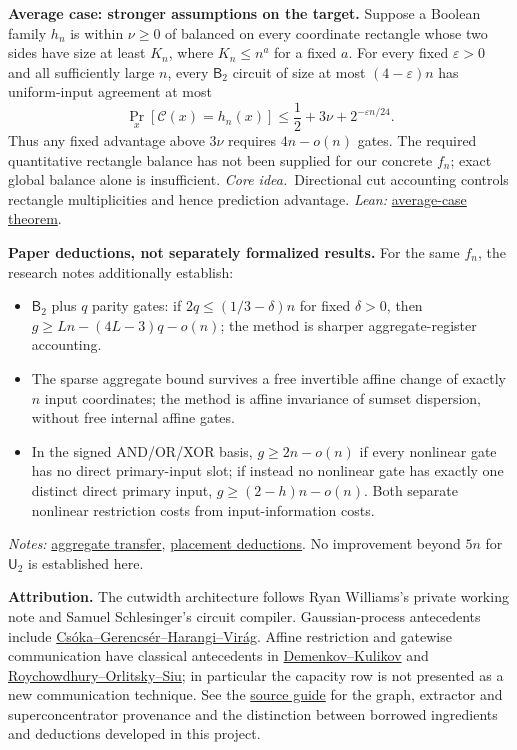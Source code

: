\documentclass[11pt]{article}
\providecommand{\RepoRoot}{../../}
\newcommand{\repolink}[2]{\href{\RepoRoot#1}{#2}}
\newcommand{\leanlink}[2]{\repolink{Complexitylib/Algebraic/LowerBound/Cutwidth/#1}{#2}}
\newcommand{\method}{\textit{Core idea.}\ }
\newcommand{\Btwo}{\mathsf{B}_2}
\newcommand{\little}[1]{o(#1)}
\begin{document}
\textbf{Average case: stronger assumptions on the target.}
Suppose a Boolean family $h_n$ is within $\nu\geq0$ of balanced on every
coordinate rectangle whose two sides have size at least $K_n$, where
$K_n\leq n^a$ for a fixed $a$. For every fixed $\varepsilon>0$ and all
sufficiently large $n$, every $\Btwo$ circuit of size at most $(4-\varepsilon)n$
has uniform-input agreement at most
\[
  \Pr_x[\mathcal C(x)=h_n(x)]
  \leq\frac12+3\nu+2^{-\varepsilon n/24}.
\]
Thus any fixed advantage above $3\nu$ requires $4n-\little n$ gates.
The required quantitative rectangle balance has not been supplied for our
concrete $f_n$; exact global balance alone is insufficient.
\method Directional cut accounting controls rectangle multiplicities and hence
prediction advantage.
\textit{Lean:} \leanlink{AverageCase.lean}{average-case theorem}.

\textbf{Paper deductions, not separately formalized results.}
For the same $f_n$, the research notes additionally establish:
\begin{itemize}
\item $\Btwo$ plus $q$ parity gates: if $2q\leq(1/3-\delta)n$ for fixed
  $\delta>0$, then $g\geq Ln-(4L-3)q-\little n$; the method is sharper
  aggregate-register accounting.
\item The sparse aggregate bound survives a free invertible affine change of
  exactly $n$ input coordinates; the method is affine invariance of sumset
  dispersion, without free internal affine gates.
\item In the signed AND/OR/XOR basis, $g\geq2n-\little n$ if every nonlinear
  gate has no direct primary-input slot; if instead no nonlinear gate has
  exactly one distinct direct primary input, $g\geq(2-h)n-\little n$.
  Both separate nonlinear restriction costs from input-information costs.
\end{itemize}
\textit{Notes:}
\repolink{research/circuit-lower-bound-frontiers/larger-gates/aggregate-proof.md}{aggregate transfer},
\repolink{research/circuit-lower-bound-frontiers/larger-gates/geometry.md}{placement deductions}.
No improvement beyond $5n$ for $\mathsf U_2$ is established here.

\smallskip
{\small\textbf{Attribution.}
The cutwidth architecture follows Ryan Williams's private working note and
Samuel Schlesinger's circuit compiler. Gaussian-process antecedents include
\href{https://arxiv.org/abs/1305.3977}{Cs\'oka--Gerencs\'er--Harangi--Vir\'ag}.
Affine restriction and gatewise communication have classical antecedents in
\href{https://eccc.weizmann.ac.il/report/2011/026/}{Demenkov--Kulikov} and
\href{https://doi.org/10.1109/18.312169}{Roychowdhury--Orlitsky--Siu}; in particular
the capacity row is not presented as a new communication technique.
See the \repolink{docs/algebraic/cutwidth-lower-bound.md}{source guide} for the
graph, extractor and superconcentrator provenance and the distinction between
borrowed ingredients and deductions developed in this project.}
\end{document}

